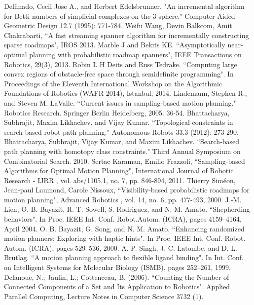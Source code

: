 \documentclass[11pt]{article}
\begin{document}

\begin{thebibliography}{1}
   Delfinado, Cecil Jose A., and Herbert Edelsbrunner. "An incremental algorithm for Betti numbers of simplicial complexes on the 3-sphere." Computer Aided Geometric Design 12.7 (1995): 771-784.
   Weifu Wang, Devin Balkcom, Amit Chakrabarti, ``A fast streaming spanner algorithm for incrementally constructing sparse roadmaps", IROS 2013.
   Marble J and Bekris KE. ``Asymptotically near-optimal planning with probabilistic roadmap spanners", IEEE Transactions on Robotics, 29(3), 2013.
   Robin L H Deits and Russ Tedrake. ``Computing large convex regions of obstacle-free space through semidefinite programming". In Proceedings of the Eleventh International Workshop on the Algorithmic Foundations of Robotics (WAFR 2014), Istanbul, 2014.
   Lindemann, Stephen R., and Steven M. LaValle. ``Current issues in sampling-based motion planning." Robotics Research. Springer Berlin Heidelberg, 2005. 36-54.
   Bhattacharya, Subhrajit, Maxim Likhachev, and Vijay Kumar. ``Topological constraints in search-based robot path planning." Autonomous Robots 33.3 (2012): 273-290.
   Bhattacharya, Subhrajit, Vijay Kumar, and Maxim Likhachev. ``Search-based path planning with homotopy class constraints." Third Annual Symposium on Combinatorial Search. 2010.
   Sertac Karaman, Emilio Frazzoli, ``Sampling-based Algorithms for Optimal Motion Planning", International Journal of Robotic Research - IJRR , vol. abs/1105.1, no. 7, pp. 846-894, 2011.
   Thierry Siméon, Jean-paul Laumond, Carole Nissoux, ``Visibility-based probabilistic roadmaps for motion planning", Advanced Robotics , vol. 14, no. 6, pp. 477-493, 2000.
   J.-M. Lien, O. B. Bayazit, R.-T. Sowell, S. Rodriguez, and N. M. Amato. ``Shepherding behaviors". In Proc. IEEE Int. Conf. Robot.Autom. (ICRA), pages 4159–4164, April 2004.
   O. B. Bayazit, G. Song, and N. M. Amato. ``Enhancing randomized motion planners: Exploring with haptic hints". In Proc. IEEE Int. Conf. Robot. Autom. (ICRA), pages 529–536, 2000.
   A. P. Singh, J.-C. Latombe, and D. L. Brutlag. ``A motion planning approach to flexible ligand binding". In Int. Conf. on Intelligent Systems for Molecular Biology (ISMB), pages 252–261, 1999.
   Delanoue, N.; Jaulin, L.; Cottenceau, B. (2006). ``Counting the Number of Connected Components of a Set and Its Application to Robotics". Applied Parallel Computing, Lecture Notes in Computer Science 3732 (1).

\end{thebibliography}
\end{document}

